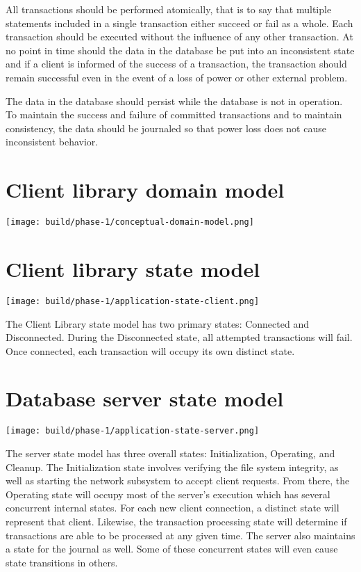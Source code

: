 \documentclass[a4paper]{report}
\begin{document}
All transactions should be performed atomically, that is to say that multiple statements included in a single transaction either succeed or fail as a whole. Each transaction should be executed without the influence of any other transaction. At no point in time should the data in the database be put into an inconsistent state and if a client is informed of the success of a transaction, the transaction should remain successful even in the event of a loss of power or other external problem.

The data in the database should persist while the database is not in operation. To maintain the success and failure of committed transactions and to maintain consistency, the data should be journaled so that power loss does not cause inconsistent behavior.

\section{Client library domain model}

	\texttt{[image: build/phase-1/conceptual-domain-model.png]}


\section{Client library state model}
	
	\begin{center}
		\texttt{[image: build/phase-1/application-state-client.png]}
	\end{center}

	The Client Library state model has two primary states: Connected and Disconnected. During the Disconnected state, all attempted transactions will fail. Once connected, each transaction will occupy its own distinct state.

\section{Database server state model}

	\texttt{[image: build/phase-1/application-state-server.png]}

	The server state model has three overall states: Initialization, Operating, and Cleanup. The Initialization state involves verifying the file system integrity, as well as starting the network subsystem to accept client requests. From there, the Operating state will occupy most of the server's execution which has several concurrent internal states. For each new client connection, a distinct state will represent that client. Likewise, the transaction processing state will determine if transactions are able to be processed at any given time. The server also maintains a state for the journal as well. Some of these concurrent states will even cause state transitions in others.
\end{document}
